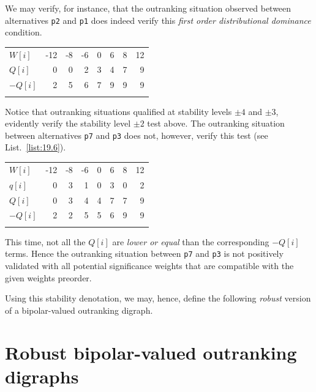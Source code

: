 We may verify, for instance, that the outranking situation observed between alternatives \texttt{p2} and \texttt{p1} does indeed verify this \emph{first order distributional dominance} condition. \hfill
\begin{center}
\begin{tabular}{l|r|r|r|r|r|r|r}
 \svhline\noalign{\smallskip}
  $W[i]$ & -12 & -8  & -6  &  0  &  6  &  8 &  12\\  
 \noalign{\smallskip}\hline\noalign{\smallskip}
  $Q[i]$  &  0 &  0 &   2 &   3  &  4  &  7  &  9 \\
  $-Q[i]$  &  2 &  5 &   6 &   7  &  9  &  9  &  9 \\
 \noalign{\smallskip}\hline
\end{tabular}
\end{center}

Notice that outranking situations qualified at stability levels $\pm 4$ and $\pm 3$, evidently verify the stability level $\pm 2$ test above. The outranking situation between alternatives \texttt{p7} and \texttt{p3} does not, however, verify this test (see List.~\vref{list:19.6}).\hfill
\begin{center}
\begin{tabular}{l|r|r|r|r|r|r|r}
 \svhline\noalign{\smallskip}
  $W[i]$ & -12 & -8  & -6  &  0  &  6  &  8 &  12\\  
 \noalign{\smallskip}\hline\noalign{\smallskip}
  $q[i]$  &  0 &  3 &   1 &   0  &  3  &  0  &  2 \\
  $Q[i]$  &  0 &  3 &   4 &   4  &  7  &  7  &  9 \\
  $-Q[i]$  &  2 &  2 &   5 &   5  &  6  &  9  &  9 \\
 \noalign{\smallskip}\hline
\end{tabular}
\end{center}

This time, not all the $Q[i]$ are \emph{lower or equal} than the corresponding $-Q[i]$ terms. Hence the outranking situation between \texttt{p7} and \texttt{p3} is not positively validated with all potential significance weights that are compatible with the given weights preorder.

Using this stability denotation, we may, hence, define the following \emph{robust} version of a bipolar-valued outranking digraph.

\section{Robust bipolar-valued outranking digraphs}
\label{sec:19.4}

